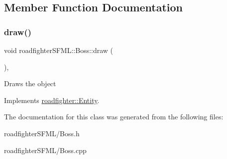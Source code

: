 \subsection{Member Function Documentation}
\mbox{\label{classroadfighterSFML_1_1Boss_a73041bc4cc4446fcf4605abe1052aa03}} 
\subsubsection{\texorpdfstring{draw()}{draw()}}
{\footnotesize\ttfamily void roadfighter\+S\+F\+M\+L\+::\+Boss\+::draw (\begin{DoxyParamCaption}{ }\end{DoxyParamCaption})\hspace{0.3cm}{\ttfamily [override]}, {\ttfamily [virtual]}}

Draws the object 

Implements \hyperlink{classroadfighter_1_1Entity_ac516f8005f969ad5a86c252e5a3640ee}{roadfighter\+::\+Entity}.



The documentation for this class was generated from the following files\+:\begin{DoxyCompactItemize}
\item 
roadfighter\+S\+F\+M\+L/Boss.\+h\item 
roadfighter\+S\+F\+M\+L/Boss.\+cpp\end{DoxyCompactItemize}
